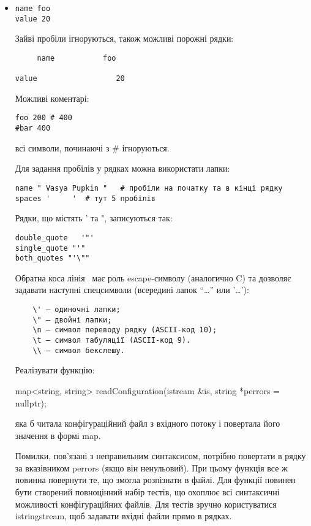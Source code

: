\documentclass[]{article}
\begin{document}
\begin{itemize}
\item
\begin{verbatim}
name foo
value 20
\end{verbatim}

  Зайві пробіли ігноруються, також можливі порожні рядки:

\begin{verbatim}
     name           foo

value                  20
\end{verbatim}

  Можливі коментарі:

\begin{verbatim}
foo 200 # 400
#bar 400
\end{verbatim}

  всі символи, починаючі з \# ігноруються.

  Для задання пробілів у рядках можна використати лапки:

\begin{verbatim}
name " Vasya Pupkin "   # пробіли на початку та в кінці рядку
spaces '     '  # тут 5 пробілів
\end{verbatim}

  Рядки, що містять ' та ", записуються так:

\begin{verbatim}
double_quote   '"'
single_quote "'"
both_quotes "'\""
\end{verbatim}

  Обратна коса лінія ~має роль escape-символу (аналогично C) та дозволяє
  задавати наступні спецсимволи (всередині лапок ``\ldots{}'' или
  '\ldots{}'):

\begin{verbatim}
    \' – одиночні лапки;
    \" – двойні лапки;
    \n – символ переводу рядку (ASCII-код 10);
    \t – символ табуляції (ASCII-код 9).
    \\ — символ бекслешу.
\end{verbatim}

  Реалізувати функцію:

  map\textless{}string, string\textgreater{} readConfiguration(istream
  \&is, string *perrors = nullptr);

  яка б читала конфігураційний файл з вхідного потоку і повертала його
  значення в формі map.

  Помилки, пов'язані з неправильним синтаксисом, потрібно повертати в
  рядку за вказівником perrors (якщо він ненульовий). При цьому функція
  все ж повинна повернути те, що змогла розпізнати в файлі. Для функції
  повинен бути створений повноцінний набір тестів, що охоплює всі
  синтаксичні можливості конфігураційних файлів. Для тестів зручно
  користуватися istringstream, щоб задавати вхідні файли прямо в рядках.
\end{itemize}
\end{document}
